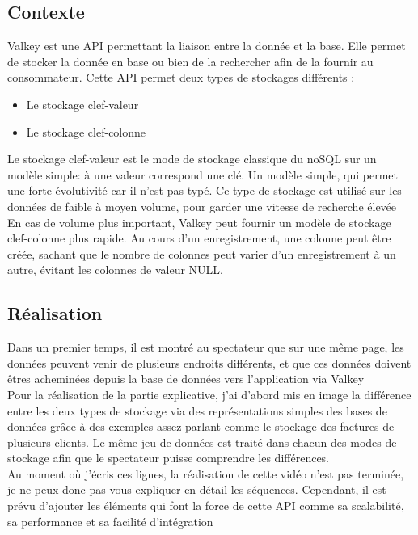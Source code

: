\subsection{Contexte}
Valkey est une API permettant la liaison entre la donnée et la base. Elle permet de stocker la donnée en base ou bien de la rechercher afin de la fournir au consommateur. Cette API permet deux types de stockages différents :\\
\begin{itemize}
\item Le stockage clef-valeur
\item Le stockage clef-colonne\\
\end{itemize}

Le stockage clef-valeur est le mode  de stockage classique du noSQL sur un modèle simple: à une valeur correspond une clé. Un modèle simple, qui permet une forte évolutivité car il n'est pas typé. Ce type de stockage est utilisé sur les données de faible à moyen volume, pour garder une vitesse de recherche élevée\\

En cas de volume plus important, Valkey peut fournir un modèle de stockage clef-colonne plus rapide. Au cours d’un enregistrement, une colonne peut être créée, sachant que le nombre de colonnes peut varier d’un enregistrement à un autre, évitant les colonnes de valeur NULL.\\


\subsection{Réalisation}

Dans un premier temps, il est montré au spectateur que sur une même page, les données peuvent venir de plusieurs endroits différents, et que ces données doivent êtres acheminées depuis la base de données vers l'application via Valkey\\

Pour la réalisation de la partie explicative, j'ai d'abord mis en image la différence entre les deux types de stockage via des représentations simples des bases de données grâce à des exemples assez parlant comme le stockage des factures de plusieurs clients. Le même jeu de données est traité dans chacun des modes de stockage afin que le spectateur puisse comprendre les différences.\\

Au moment où j'écris ces lignes, la réalisation de cette vidéo n'est pas terminée, je ne peux donc pas vous expliquer en détail les séquences. Cependant, il est prévu d'ajouter les éléments qui font la force de cette API comme sa scalabilité, sa performance et sa facilité d'intégration 



